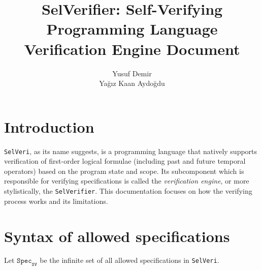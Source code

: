 \documentclass{article}
\title{SelVerifier: Self-Verifying Programming Language \\ Verification Engine Document \\}
\author{Yusuf Demir \\ Yağız Kaan Aydoğdu}
\begin{document}
\maketitle

\section{Introduction}
\texttt{SelVeri}, as its name suggests, is a programming language that natively supports verification of first-order logical formulae (including past and future temporal operators) based on the program state and scope. Its subcomponent which is responsible for verifying specifications is called the \textit{verification engine}, or more stylistically, the \texttt{SelVerifier}. This documentation focuses on how the verifying process works and its limitations.

\section{Syntax of allowed specifications}

Let $\mathtt{Spec}_{\mathtt{SV}}$ be the infinite set of all allowed specifications in \texttt{SelVeri}.
\end{document}
